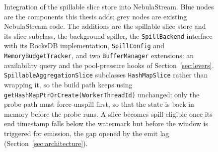 \begin{figure}[H]
{\begin{tikzpicture}
\end{tikzpicture}%
}
\caption[NebulaStream out-of-core integration architecture]{%
Integration of the spillable slice store into NebulaStream. Blue nodes are the
components this thesis adds; grey nodes are existing NebulaStream code. The
additions are the spillable slice store and its slice subclass, the background
spiller, the \texttt{SpillBackend} interface with its RocksDB implementation,
\texttt{SpillConfig} and \texttt{MemoryBudgetTracker}, and two
\texttt{BufferManager} extensions: an availability query and the pool-pressure
hooks of Section~\ref{sec:levers}. \texttt{SpillableAggregationSlice} subclasses
\texttt{HashMapSlice} rather than wrapping it, so the build path keeps
using \texttt{getHashMapPtrOrCreate(WorkerThreadId)} unchanged; only the probe
path must force-unspill first, so that the state is back in memory before the
probe runs. A slice becomes spill-eligible once its end timestamp falls below
the watermark but before the window is triggered for emission, the gap opened
by the emit lag (Section~\ref{sec:architecture}).}
\label{fig:ooc-integration}
\end{figure}
